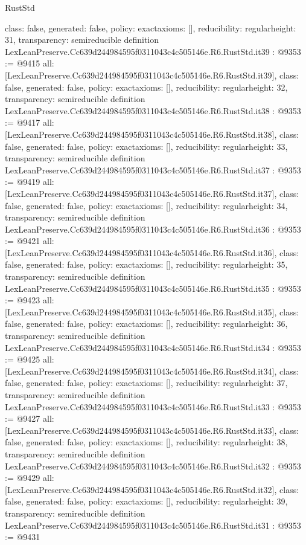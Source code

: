 \begin{lexlean}{RustStd}
\begin{coremodule}
{  class: false,
  generated: false,
  policy: exact{axioms: []},
  reducibility: regular{height: 31},
  transparency: semireducible
}
definition LexLeanPreserve.Cc639d244984595f0311043c4c505146e.R6.RustStd.it39 : @9353 := @9415 {
  all: [LexLeanPreserve.Cc639d244984595f0311043c4c505146e.R6.RustStd.it39],
  class: false,
  generated: false,
  policy: exact{axioms: []},
  reducibility: regular{height: 32},
  transparency: semireducible
}
definition LexLeanPreserve.Cc639d244984595f0311043c4c505146e.R6.RustStd.it38 : @9353 := @9417 {
  all: [LexLeanPreserve.Cc639d244984595f0311043c4c505146e.R6.RustStd.it38],
  class: false,
  generated: false,
  policy: exact{axioms: []},
  reducibility: regular{height: 33},
  transparency: semireducible
}
definition LexLeanPreserve.Cc639d244984595f0311043c4c505146e.R6.RustStd.it37 : @9353 := @9419 {
  all: [LexLeanPreserve.Cc639d244984595f0311043c4c505146e.R6.RustStd.it37],
  class: false,
  generated: false,
  policy: exact{axioms: []},
  reducibility: regular{height: 34},
  transparency: semireducible
}
definition LexLeanPreserve.Cc639d244984595f0311043c4c505146e.R6.RustStd.it36 : @9353 := @9421 {
  all: [LexLeanPreserve.Cc639d244984595f0311043c4c505146e.R6.RustStd.it36],
  class: false,
  generated: false,
  policy: exact{axioms: []},
  reducibility: regular{height: 35},
  transparency: semireducible
}
definition LexLeanPreserve.Cc639d244984595f0311043c4c505146e.R6.RustStd.it35 : @9353 := @9423 {
  all: [LexLeanPreserve.Cc639d244984595f0311043c4c505146e.R6.RustStd.it35],
  class: false,
  generated: false,
  policy: exact{axioms: []},
  reducibility: regular{height: 36},
  transparency: semireducible
}
definition LexLeanPreserve.Cc639d244984595f0311043c4c505146e.R6.RustStd.it34 : @9353 := @9425 {
  all: [LexLeanPreserve.Cc639d244984595f0311043c4c505146e.R6.RustStd.it34],
  class: false,
  generated: false,
  policy: exact{axioms: []},
  reducibility: regular{height: 37},
  transparency: semireducible
}
definition LexLeanPreserve.Cc639d244984595f0311043c4c505146e.R6.RustStd.it33 : @9353 := @9427 {
  all: [LexLeanPreserve.Cc639d244984595f0311043c4c505146e.R6.RustStd.it33],
  class: false,
  generated: false,
  policy: exact{axioms: []},
  reducibility: regular{height: 38},
  transparency: semireducible
}
definition LexLeanPreserve.Cc639d244984595f0311043c4c505146e.R6.RustStd.it32 : @9353 := @9429 {
  all: [LexLeanPreserve.Cc639d244984595f0311043c4c505146e.R6.RustStd.it32],
  class: false,
  generated: false,
  policy: exact{axioms: []},
  reducibility: regular{height: 39},
  transparency: semireducible
}
definition LexLeanPreserve.Cc639d244984595f0311043c4c505146e.R6.RustStd.it31 : @9353 := @9431 {
}
\end{coremodule}
\end{lexlean}
